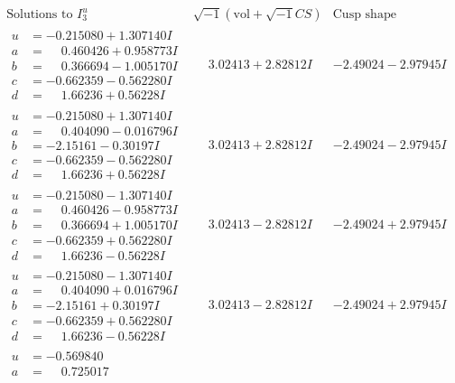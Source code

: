 \documentclass[1p]{elsarticle_modified}
\theoremstyle{definition}
\newcommand{\I}{\sqrt{-1}}
\begin{document}
$$\begin{array}{c|c|c}  
\text{Solutions to }I^u_{3}& \I (\text{vol} + \sqrt{-1}CS) & \text{Cusp shape}\\
 \hline 
\begin{aligned}
u &= -0.215080 + 1.307140 I \\
a &= \phantom{-}0.460426 + 0.958773 I \\
b &= \phantom{-}0.366694 - 1.005170 I \\
c &= -0.662359 - 0.562280 I \\
d &= \phantom{-}1.66236 + 0.56228 I\end{aligned}
 & \phantom{-}3.02413 + 2.82812 I & -2.49024 - 2.97945 I \\ \hline\begin{aligned}
u &= -0.215080 + 1.307140 I \\
a &= \phantom{-}0.404090 - 0.016796 I \\
b &= -2.15161 - 0.30197 I \\
c &= -0.662359 - 0.562280 I \\
d &= \phantom{-}1.66236 + 0.56228 I\end{aligned}
 & \phantom{-}3.02413 + 2.82812 I & -2.49024 - 2.97945 I \\ \hline\begin{aligned}
u &= -0.215080 - 1.307140 I \\
a &= \phantom{-}0.460426 - 0.958773 I \\
b &= \phantom{-}0.366694 + 1.005170 I \\
c &= -0.662359 + 0.562280 I \\
d &= \phantom{-}1.66236 - 0.56228 I\end{aligned}
 & \phantom{-}3.02413 - 2.82812 I & -2.49024 + 2.97945 I \\ \hline\begin{aligned}
u &= -0.215080 - 1.307140 I \\
a &= \phantom{-}0.404090 + 0.016796 I \\
b &= -2.15161 + 0.30197 I \\
c &= -0.662359 + 0.562280 I \\
d &= \phantom{-}1.66236 - 0.56228 I\end{aligned}
 & \phantom{-}3.02413 - 2.82812 I & -2.49024 + 2.97945 I \\ \hline\begin{aligned}
u &= -0.569840\phantom{ +0.000000I} \\
a &= \phantom{-}0.725017\phantom{ +0.000000I} \\

\end{aligned}
\end{array}$$
\end{document}
